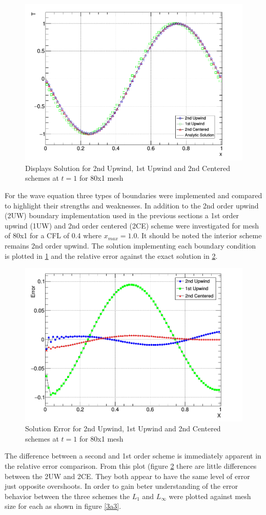 \documentclass[paper=a4, fontsize=11pt, abstract=on]{scrartcl}
\numberwithin{equation}{section}		%
\numberwithin{figure}{section}			%
\numberwithin{table}{section}				%
\begin{document}
\begin{figure}[H]
\centering
\includegraphics[width=0.75\linewidth]{3a1}
\caption{Displays Solution for 2nd Upwind, 1st Upwind and 2nd Centered schemes at $t=1$ for 80x1 mesh}
\label{3a1}
\end{figure}
For the wave equation three types of boundaries were implemented and compared to highlight their strengths and weaknesses. In addition to the 2nd order upwind (2UW) boundary implementation used in the previous sections a 1st order upwind (1UW) and 2nd order centered (2CE) scheme were investigated for mesh of 80x1 for a CFL of 0.4 where $x_{max} = 1.0$. It should be noted the interior scheme remains 2nd order upwind. The solution implementing each boundary condition is plotted in \ref{3a1} and the relative error against the exact solution in \ref{3a2}.

\begin{figure}[H]
\centering
\includegraphics[width=0.75\linewidth]{3a2}
\caption{Solution Error for 2nd Upwind, 1st Upwind and 2nd Centered schemes at $t=1$ for 80x1 mesh}
\label{3a2}
\end{figure}

The difference between a second and 1st order scheme is immediately apparent in the relative error comparison. From this plot (figure \ref{3a2} there are little differences between the 2UW and 2CE. They both appear to have the same level of error just opposite overshoots. In order to gain beter understanding of the error behavior between the three schemes the $L_1$ and $L_{\infty}$ were plotted against mesh size for each as shown in figure \ref{3a3}.
\end{document}
